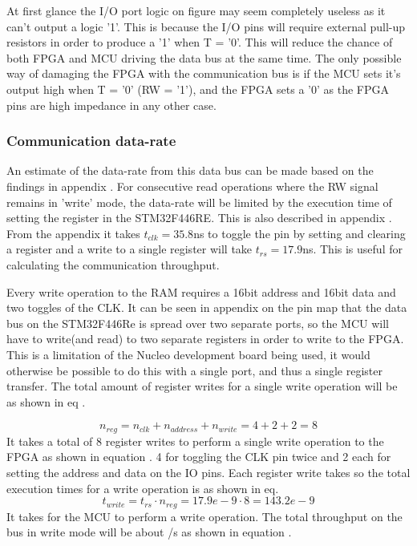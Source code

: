 At first glance the I/O port logic on figure  may seem completely useless as it can't output a logic '1'. This is because the I/O pins will require external pull-up resistors in order to produce a '1' when T = '0'. This will reduce the chance of both FPGA and MCU driving the data bus at the same time. The only possible way of damaging the FPGA with the communication bus is if the MCU sets it's output high when T = '0' (RW = '1'), and the FPGA sets a '0' as the FPGA pins are high impedance in any other case.

\subsubsection{Communication data-rate} \label{subsubsec:CommunicationDatarate}

An estimate of the data-rate from this data bus can be made based on the findings in appendix . For consecutive read operations where the RW signal remains in 'write' mode, the data-rate will be limited by the execution time of setting the register in the STM32F446RE. This is also described in appendix . From the appendix it takes $t_{clk} = 35.8$ns to toggle the pin by setting and clearing a register and a write to a single register will take $t_{rs} = 17.9$ns. This is useful for calculating the communication throughput.

Every write operation to the RAM requires a 16bit address and 16bit data and two toggles of the CLK. It can be seen in appendix  on the pin map that the data bus on the STM32F446Re is spread over two separate ports, so the MCU will have to write(and read) to two separate registers in order to write to the FPGA. This is a limitation of the Nucleo development board being used, it would otherwise be possible to do this with a single port, and thus a single register transfer. The total amount of register writes for a single write operation will be as shown in eq .

\begin{equation}\label{eq:7_2_1_Write_ThroughPut}
    n_{reg} = n_{clk} +  n_{address} + n_{write} = 4+2+2 = 8 
\end{equation}
It takes a total of 8 register writes to perform a single write operation to the FPGA as shown in equation . 4 for toggling the CLK pin twice and 2 each for setting the address and data on the IO pins. Each register write takes  so the total execution times for a write operation is  as shown in eq.
\begin{equation}\label{eq:7_2_1_Write_ThroughPutTotalTime}
    t_{write} = t_{rs} \cdot n_{reg} = 17.9e-9 \cdot 8 =  143.2e-9
\end{equation}
It takes  for the MCU to perform a write operation. The total throughput on the bus in write mode will be about /s as shown in equation .

